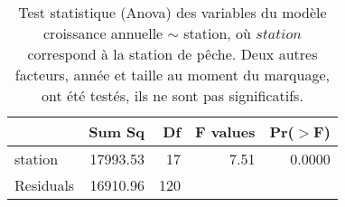 \begin{table}[ht]
\centering
\begin{tabular}{lrrrr}
  \hline
 & Sum Sq & Df & F values & Pr($>$F) \\ 
  \hline
station & 17993.53 & 17 & 7.51 & 0.0000 \\ 
  Residuals & 16910.96 & 120 &  &  \\ 
   \hline
\end{tabular}
\caption{Test statistique (Anova) des variables du modèle croissance annuelle $\sim$ station,
						où $station$ correspond à la station de pêche. Deux autres facteurs, année et taille au moment du marquage,
						ont été testés, ils ne sont pas significatifs.} 
\label{table_anova_marquage}
\end{table}
